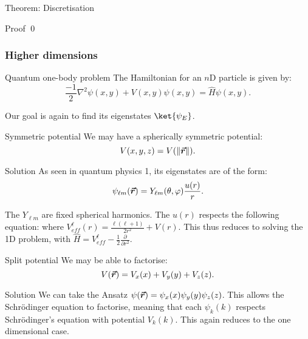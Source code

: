 \documentclass[a4paper]{article}
\begin{document}
\begin{parag}{Theorem: Discretisation}
\begin{subparag}{Proof}
        \qed
    \end{subparag}
\end{parag}

\subsubsection{Higher dimensions}

\begin{parag}{Quantum one-body problem}
    The Hamiltonian for an $n$D particle is given by:
    \[\frac{-1}{2} \nabla^2 \psi\left(x, y\right) + V\left(x, y\right) \psi\left(x, y\right) = \hat{H} \psi\left(x, y\right).\]

    Our goal is again to find its eigenstates $\ket{\psi_E}$.
\end{parag}

\begin{parag}{Symmetric potential}
    We may have a spherically symmetric potential: 
    \[V\left(x, y, z\right) = V\left(\left\|\bvec{r}\right\|\right).\]

    \begin{subparag}{Solution}
        As seen in quantum physics 1, its eigenstates are of the form: 
        \[\psi_{\ell m}\left(\bvec{r}\right) = Y_{\ell m}\left(\theta, \phi\right) \frac{u\left(r\right)}{r}.\]

        The $Y_{\ell m}$ are fixed spherical harmonics. The $u\left(r\right)$ respects the following equation:
        where $V_{eff}^{\ell}\left(r\right) = \frac{\ell\left(\ell + 1\right)}{2 r^2} + V\left(r\right)$. This thus reduces to solving the 1D problem, with $\hat{H} = V_{eff}^{\ell} - \frac{1}{2} \frac{\partial}{\partial r^2}$. 
    \end{subparag}
\end{parag}

\begin{parag}{Split potential}
    We may be able to factorise:
    \[V\left(\bvec{r}\right) = V_x\left(x\right) + V_y\left(y\right) + V_z\left(z\right).\]

    \begin{subparag}{Solution}
        We can take the Ansatz $\psi\left(\bvec{r}\right) = \psi_x\left(x\right) \psi_y\left(y\right) \psi_z\left(z\right)$. This allows the Schrödinger equation to factorise, meaning that each $\psi_k\left(k\right)$ respects Schrödinger's equation with potential $V_k\left(k\right)$. This again reduces to the one dimensional case.
    \end{subparag}
\end{parag}
\end{document}
